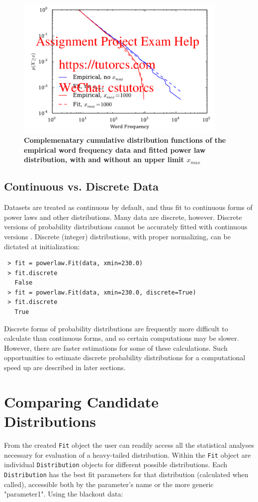 \documentclass[10pt]{article}
\begin{document}
\begin{figure}[!ht]
\begin{center}
\includegraphics[width=4in]{FigCCDFmax.pdf}
\end{center}
\caption{
{\bf Complemenatary cumulative distribution functions of the empirical word frequency data and fitted power law distribution, with and without an upper limit $x_{max}$}
}
\label{CCDFmax}
\end{figure}

 \subsection*{Continuous vs. Discrete Data}
 Datasets are treated as continuous by default, and thus fit to continuous forms of power laws and other distributions. Many data are discrete, however. Discrete versions of probability distributions cannot be accurately fitted with continuous versions \cite{Clauset2009}. Discrete (integer) distributions, with proper normalizing, can be dictated at initialization:
 
 \begin{verbatim}
 > fit = powerlaw.Fit(data, xmin=230.0)
 > fit.discrete
   False
 > fit = powerlaw.Fit(data, xmin=230.0, discrete=True)
 > fit.discrete 
   True
 \end{verbatim}
 
 Discrete forms of probability distributions are frequently more difficult to calculate than continuous forms, and so certain computations may be slower. However, there are faster estimations for some of these calculations. Such opportunities to estimate discrete probability distributions for a computational speed up are described in later sections.
 
 \section*{Comparing Candidate Distributions}
 From the created \verb"Fit" object the user can readily access all the statistical analyses necessary for evaluation of a heavy-tailed distribution. Within the \verb"Fit" object are individual \verb"Distribution" objects for different possible distributions. Each \verb"Distribution" has the best fit parameters for that distribution (calculated when called), accessible both by the parameter's name or the more generic "parameter1". Using the blackout data:
 
\end{document}
